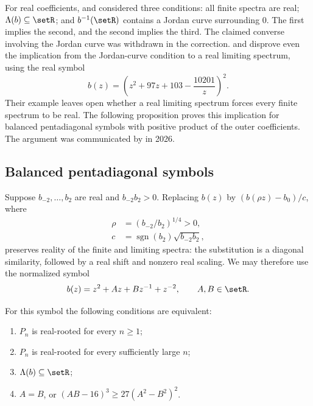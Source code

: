 For real coefficients,  and 
\cite{ShapiroStampach2019,ShapiroStampach2023Correction} considered three conditions:
all finite spectra are real; $\Lambda(b)\subseteq\setR$; and
$b^{-1}(\setR)$ contains a Jordan curve surrounding $0$.
The first implies the second, and the second implies the third.
The claimed converse involving the Jordan curve was withdrawn in the correction.
 and 
\cite[Thm.~1.3]{RohnerThalhammer2026} disprove even the implication from
the Jordan-curve condition to a real limiting spectrum, using the real symbol
\[
 b(z)=\left(z^2+97z+103-\frac{10201}{z}\right)^2.
\]
Their example leaves open whether a real limiting spectrum forces every
finite spectrum to be real. The following proposition proves this implication
for balanced pentadiagonal symbols with positive product of the outer
coefficients. The argument was communicated by  in
2026.

\subsection[toeplitzPentadiagonal]{Balanced pentadiagonal symbols}

Suppose $b_{-2},\dotsc,b_2$ are real and $b_{-2}b_2>0$.
Replacing $b(z)$ by $(b(\rho z)-b_0)/c$, where
\begin{align*}
 \rho&=(b_{-2}/b_2)^{1/4}>0,\\
 c&=\operatorname{sgn}(b_2)\sqrt{b_{-2}b_2},
\end{align*}
preserves reality of the finite and limiting spectra: the substitution is
a diagonal similarity, followed by a real shift and nonzero real scaling.
We may therefore use the normalized symbol
\[
 b(z)=z^2+Az+Bz^{-1}+z^{-2},\qquad A,B\in\setR.
\]

\begin{proposition}
For this symbol the following conditions are equivalent:
\begin{enumerate}
\item $P_n$ is real-rooted for every $n\geq1$;
\item $P_n$ is real-rooted for every sufficiently large $n$;
\item $\Lambda(b)\subseteq\setR$;
\item $A=B$, or $(AB-16)^3\geq27(A^2-B^2)^2$.
\end{enumerate}
\end{proposition}

